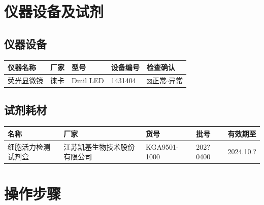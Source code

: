 \documentclass[UTF8,10pt,a4paper,fontset=fandol]{ctexart}
\newcommand{\fieldvalue}[1]{#1}
\newcommand{\handwritten}[1]{#1}
\begin{document}
\section{仪器设备及试剂}

\subsection{仪器设备}

\begin{center}
\begin{tabularx}{\textwidth}{|X|X|X|X|X|}
\hline
仪器名称 & 厂家 & 型号 & 设备编号 & 检查确认\\
\hline
\fieldvalue{荧光显微镜} &
\fieldvalue{徕卡} &
\fieldvalue{Dmil LED} &
\fieldvalue{1431404} &
\fieldvalue{\ensuremath{\boxtimes}正常\quad $\square$异常}\\
\hline
\end{tabularx}
\end{center}

\subsection{试剂耗材}

\begin{center}
\begin{tabularx}{\textwidth}{|X|X|X|X|X|}
\hline
名称 & 厂家 & 货号 & 批号 & 有效期至\\
\hline
\fieldvalue{细胞活力检测试剂盒} &
\fieldvalue{江苏凯基生物技术股份有限公司} &
\fieldvalue{KGA9501-1000} &
\fieldvalue{\handwritten{202?0400}} &
\fieldvalue{\handwritten{2024.10.?}}\\
\hline
\end{tabularx}
\end{center}

\section{操作步骤}
\end{document}
